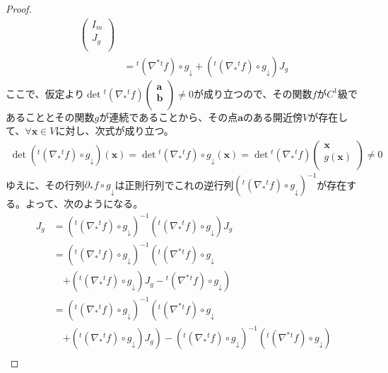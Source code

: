 \documentclass[dvipdfmx]{jsarticle}
\begin{document}
\begin{proof}
\begin{align*}
\begin{pmatrix}
I_{m} \\
J_{g} \\
\end{pmatrix}\\
&={}^{t}\left( \nabla^{*}{}^{t}f \right) \circ g_{\downarrow} + \left({}^{t}\left( \nabla_{*}{}^{t}f \right) \circ g_{\downarrow} \right)J_{g}
\end{align*}
ここで、仮定より$\det{{}^{t}\left( \nabla_{*}{}^{t}f \right)}\begin{pmatrix}
\mathbf{a} \\
\mathbf{b} \\
\end{pmatrix} \neq 0$が成り立つので、その関数$f$が$C^{1}$級であることとその関数$g$が連続であることから、その点$\mathbf{a}$のある開近傍$V$が存在して、$\forall\mathbf{x} \in V$に対し、次式が成り立つ。
\begin{align*}
\det\left({}^{t}\left( \nabla_{*}{}^{t}f \right) \circ g_{\downarrow} \right)\left( \mathbf{x} \right) = \det{{}^{t}\left( \nabla_{*}{}^{t}f \right)} \circ g_{\downarrow}\left( \mathbf{x} \right) = \det{{}^{t}\left( \nabla_{*}{}^{t}f \right)}\begin{pmatrix}
\mathbf{x} \\
g\left( \mathbf{x} \right) \\
\end{pmatrix} \neq 0
\end{align*}
ゆえに、その行列$\partial_{*}f \circ g_{\downarrow}$は正則行列でこれの逆行列$\left({}^{t}\left( \nabla_{*}{}^{t}f \right) \circ g_{\downarrow} \right)^{- 1}$が存在する。よって、次のようになる。
\begin{align*}
J_{g} &= \left({}^{t}\left( \nabla_{*}{}^{t}f \right) \circ g_{\downarrow} \right)^{- 1}\left({}^{t}\left( \nabla_{*}{}^{t}f \right) \circ g_{\downarrow} \right)J_{g}\\
&= \left({}^{t}\left( \nabla_{*}{}^{t}f \right) \circ g_{\downarrow} \right)^{- 1}\left({}^{t}\left( \nabla^{*}{}^{t}f \right) \circ g_{\downarrow} \right. \\
&\quad \left. + \left({}^{t}\left( \nabla_{*}{}^{t}f \right) \circ g_{\downarrow} \right)J_{g} -{}^{t}\left( \nabla^{*}{}^{t}f \right) \circ g_{\downarrow} \right)\\
&= \left({}^{t}\left( \nabla_{*}{}^{t}f \right) \circ g_{\downarrow} \right)^{- 1}\left({}^{t}\left( \nabla^{*}{}^{t}f \right) \circ g_{\downarrow} \right. \\
&\quad \left. + \left({}^{t}\left( \nabla_{*}{}^{t}f \right) \circ g_{\downarrow} \right)J_{g} \right) - \left({}^{t}\left( \nabla_{*}{}^{t}f \right) \circ g_{\downarrow} \right)^{- 1}\left({}^{t}\left( \nabla^{*}{}^{t}f \right) \circ g_{\downarrow} \right)\\

\end{align*}
\end{proof}
\end{document}
